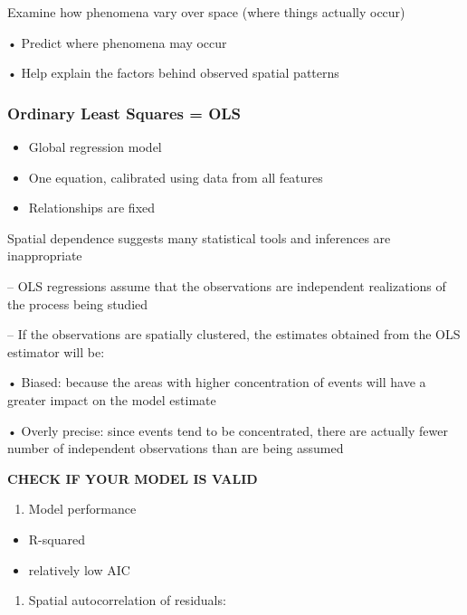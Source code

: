 \documentclass[
]{article}
\providecommand{\tightlist}{%
  \setlength{\itemsep}{0pt}\setlength{\parskip}{0pt}}
\begin{document}
Examine how phenomena vary over space (where things actually occur)

• Predict where phenomena may occur

• Help explain the factors behind observed spatial patterns

\hypertarget{ordinary-least-squares-ols}{%
\subsubsection{Ordinary Least Squares =
OLS}\label{ordinary-least-squares-ols}}

\begin{itemize}
\item
  Global regression model
\item
  One equation, calibrated using data from all features
\item
  Relationships are fixed
\end{itemize}

Spatial dependence suggests many statistical tools and inferences are
inappropriate

-- OLS regressions assume that the observations are independent
realizations of the process being studied

-- If the observations are spatially clustered, the estimates obtained
from the OLS estimator will be:

• Biased: because the areas with higher concentration of events will
have a greater impact on the model estimate

• Overly precise: since events tend to be concentrated, there are
actually fewer number of independent observations than are being assumed

\textbf{CHECK IF YOUR MODEL IS VALID}

\begin{enumerate}
\def\labelenumi{\arabic{enumi}.}
\tightlist
\item
  Model performance
\end{enumerate}

\begin{itemize}
\item
  R-squared
\item
  relatively low AIC
\end{itemize}

\begin{enumerate}
\def\labelenumi{\arabic{enumi}.}
\setcounter{enumi}{1}
\tightlist
\item
  Spatial autocorrelation of residuals:
\end{enumerate}
\end{document}
